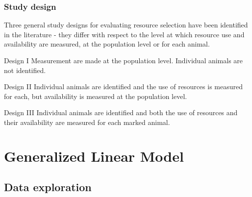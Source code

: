 \documentclass[10pt]{beamer}
\begin{document}
\begin{frame}
\frametitle{Study design}

Three general study designs for evaluating resource selection have been identified in the literature - they differ with respect to the level at which resource use and availability are measured, at the population level or for each animal.\\

\begin{block}{Design I}
Measurement are made at the population level. Individual animals are not identified.
\end{block}

\begin{block}{Design II}
Individual animals are identified and the use of resources is measured for each, but availability is measured at the population level.
\end{block}

\begin{block}{Design III}
Individual animals are identified and both the use of resources and their availability are measured for each marked animal.
\end{block}

\end{frame}


\section{Generalized Linear Model}
\subsection{Data exploration}
\end{document}
